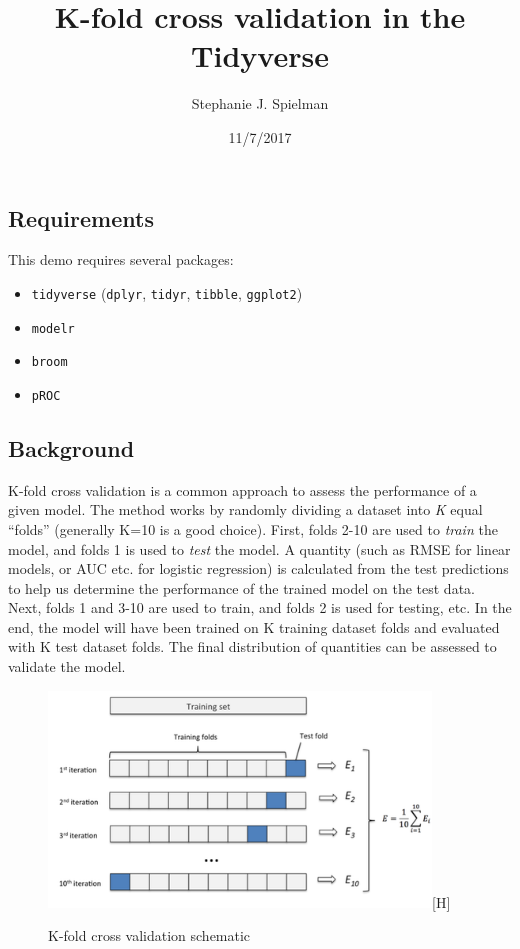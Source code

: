 \documentclass[]{article}
\title{K-fold cross validation in the Tidyverse}
\author{Stephanie J. Spielman}
\date{11/7/2017}
\providecommand{\tightlist}{%
  \setlength{\itemsep}{0pt}\setlength{\parskip}{0pt}}
\begin{document}
\maketitle

\subsection{Requirements}\label{requirements}

This demo requires several packages:

\begin{itemize}
\tightlist
\item
  \texttt{tidyverse} (\texttt{dplyr}, \texttt{tidyr}, \texttt{tibble},
  \texttt{ggplot2})
\item
  \texttt{modelr}
\item
  \texttt{broom}
\item
  \texttt{pROC}
\end{itemize}

\subsection{Background}\label{background}

K-fold cross validation is a common approach to assess the performance
of a given model. The method works by randomly dividing a dataset into
\emph{K} equal ``folds'' (generally K=10 is a good choice). First, folds
2-10 are used to \emph{train} the model, and folds 1 is used to
\emph{test} the model. A quantity (such as RMSE for linear models, or
AUC etc. for logistic regression) is calculated from the test
predictions to help us determine the performance of the trained model on
the test data. Next, folds 1 and 3-10 are used to train, and folds 2 is
used for testing, etc. In the end, the model will have been trained on K
training dataset folds and evaluated with K test dataset folds. The
final distribution of quantities can be assessed to validate the model.

\begin{figure}
\centering
\includegraphics[width=4in]{k-fold.png}[H]
\caption{K-fold cross validation schematic}
\end{figure}
\end{document}
